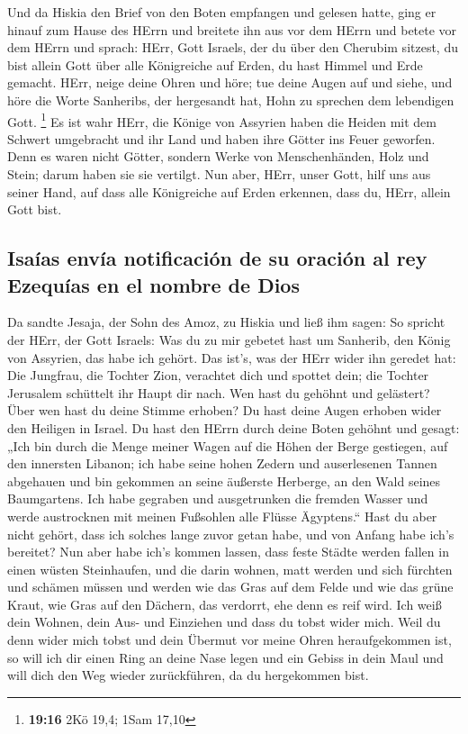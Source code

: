  Und da Hiskia den Brief von den Boten empfangen und
gelesen hatte, ging er hinauf zum Hause des HErrn und breitete ihn aus
vor dem HErrn  und betete vor dem HErrn und sprach: HErr,
Gott Israels, der du über den Cherubim sitzest, du bist allein Gott über
alle Königreiche auf Erden, du hast Himmel und Erde gemacht.
 HErr, neige deine Ohren und höre; tue deine Augen auf
und siehe, und höre die Worte Sanheribs, der hergesandt hat, Hohn zu
sprechen dem lebendigen Gott. \footnote{\textbf{19:16} 2Kö 19,4; 1Sam
  17,10}  Es ist wahr HErr, die Könige von Assyrien haben
die Heiden mit dem Schwert umgebracht und ihr Land  und
haben ihre Götter ins Feuer geworfen. Denn es waren nicht Götter,
sondern Werke von Menschenhänden, Holz und Stein; darum haben sie sie
vertilgt.  Nun aber, HErr, unser Gott, hilf uns aus
seiner Hand, auf dass alle Königreiche auf Erden erkennen, dass du,
HErr, allein Gott bist.

\hypertarget{isauxedas-envuxeda-notificaciuxf3n-de-su-oraciuxf3n-al-rey-ezequuxedas-en-el-nombre-de-dios}{%
\subsection{Isaías envía notificación de su oración al rey Ezequías en
el nombre de
Dios}\label{isauxedas-envuxeda-notificaciuxf3n-de-su-oraciuxf3n-al-rey-ezequuxedas-en-el-nombre-de-dios}}

 Da sandte Jesaja, der Sohn des Amoz, zu Hiskia und ließ
ihm sagen: So spricht der HErr, der Gott Israels: Was du zu mir gebetet
hast um Sanherib, den König von Assyrien, das habe ich gehört.
 Das ist's, was der HErr wider ihn geredet hat: Die
Jungfrau, die Tochter Zion, verachtet dich und spottet dein; die Tochter
Jerusalem schüttelt ihr Haupt dir nach.  Wen hast du
gehöhnt und gelästert? Über wen hast du deine Stimme erhoben? Du hast
deine Augen erhoben wider den Heiligen in Israel.  Du
hast den HErrn durch deine Boten gehöhnt und gesagt: „Ich bin durch die
Menge meiner Wagen auf die Höhen der Berge gestiegen, auf den innersten
Libanon; ich habe seine hohen Zedern und auserlesenen Tannen abgehauen
und bin gekommen an seine äußerste Herberge, an den Wald seines
Baumgartens.  Ich habe gegraben und ausgetrunken die
fremden Wasser und werde austrocknen mit meinen Fußsohlen alle Flüsse
Ägyptens.``  Hast du aber nicht gehört, dass ich solches
lange zuvor getan habe, und von Anfang habe ich's bereitet? Nun aber
habe ich's kommen lassen, dass feste Städte werden fallen in einen
wüsten Steinhaufen,  und die darin wohnen, matt werden
und sich fürchten und schämen müssen und werden wie das Gras auf dem
Felde und wie das grüne Kraut, wie Gras auf den Dächern, das verdorrt,
ehe denn es reif wird.  Ich weiß dein Wohnen, dein Aus-
und Einziehen und dass du tobst wider mich.  Weil du denn
wider mich tobst und dein Übermut vor meine Ohren heraufgekommen ist, so
will ich dir einen Ring an deine Nase legen und ein Gebiss in dein Maul
und will dich den Weg wieder zurückführen, da du hergekommen bist.

